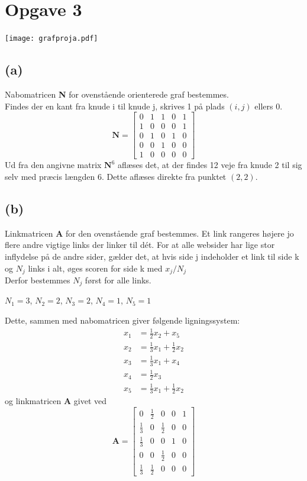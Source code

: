 \documentclass[12pt]{article}
\begin{document}
\section{Opgave 3}
\begin{center}
\texttt{[image: grafproja.pdf]}
\end{center}
\subsection{(a)}
Nabomatricen \textbf{N} for ovenstående orienterede graf bestemmes.\\
Findes der en kant fra knude i til knude j, skrives 1 på plads $(i,j)$ ellers 0.
$$
\mathbf{N}=
\begin{bmatrix}
0&1&1&0&1\\
1&0&0&0&1\\
0&1&0&1&0\\
0&0&1&0&0\\
1&0&0&0&0
\end{bmatrix}
$$
Ud fra den angivne matrix $\mathbf{N}^6$ aflæses det, at der findes 12 veje fra knude 2 til sig selv med præcis længden 6. Dette aflæses direkte fra punktet $(2,2)$.
\subsection{(b)} Linkmatricen \textbf{A} for den ovenstående graf bestemmes.
Et link rangeres højere jo flere andre vigtige links der linker til dét. For at alle websider har lige stor inflydelse på de andre sider, gælder det, at hvis side j indeholder et link til side k og $N_j$ links i alt, øges scoren for side k med ${x_j}/{N_j}$\\
Derfor bestemmes $N_j$ først for alle links.
\begin{center}
$N_1=3$, $N_2=2$, $N_3=2$, $N_4=1$, $N_5=1$
\end{center}
Dette, sammen med nabomatricen giver følgende ligningssystem:
\begin{align*}
x_1&=\frac{1}{2}x_2+x_5 \\
x_2&=\frac{1}{3}x_1+\frac{1}{2}x_2\\
x_3&=\frac{1}{3}x_1+x_4\\
x_4&=\frac{1}{2}x_3\\
x_5&=\frac{1}{3}x_1+\frac{1}{2}x_2
\end{align*}
og linkmatricen \textbf{A} givet ved
$$
\mathbf{A}=
\begin{bmatrix}
0&\frac{1}{2}&0&0&1\\
\frac{1}{3}&0&\frac{1}{2}&0&0\\
\frac{1}{3}&0&0&1&0\\
0&0&\frac{1}{2}&0&0\\
\frac{1}{3}&\frac{1}{2}&0&0&0
\end{bmatrix}
$$
\end{document}
